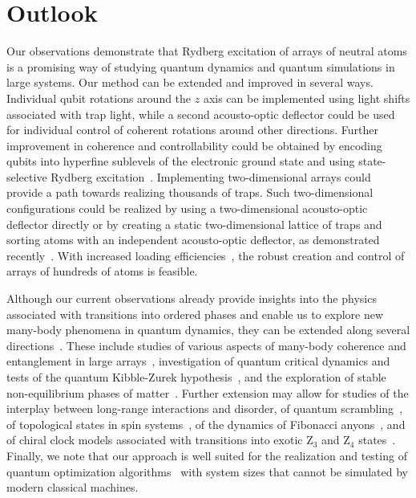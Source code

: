\documentclass[prl,nobalancelastpage,twocolumn,superscriptaddress,nofootinbib]{revtex4}
\begin{document}
\section{Outlook}
Our observations demonstrate that Rydberg excitation of arrays of neutral atoms
is a promising way of studying quantum dynamics and quantum simulations in
large systems. Our method can be extended and improved in several ways.
Individual qubit rotations around the $z$ axis can be implemented using light
shifts associated with trap light, while a second acousto-optic deflector could be used for
individual control of coherent rotations around other directions. Further
improvement in coherence and controllability could be obtained by encoding qubits
into hyperfine sublevels of the electronic ground state and using
state-selective Rydberg excitation~\cite{Zeiher2017}.  Implementing
two-dimensional arrays could provide a path towards realizing thousands of
traps. Such two-dimensional configurations could be realized by using
a two-dimensional acousto-optic deflector directly or by creating a static two-dimensional
lattice of traps and sorting atoms with an independent acousto-optic deflector, as demonstrated
recently~\cite{Barredo2016}. With increased
loading efficiencies~\cite{Lester2015}, the robust creation and control of
arrays of hundreds of atoms is feasible. 

Although our current observations already provide insights into
the physics associated with transitions into ordered phases and enable us to explore
new many-body phenomena in quantum dynamics, they can be extended
along several directions~\cite{Weimer2010_b}. These include studies of various
aspects of many-body coherence and entanglement in large
arrays~\cite{Pichler2016}, investigation of quantum critical dynamics and tests
of the quantum Kibble-Zurek hypothesis~\cite{Zurek2005}, and the exploration of
stable non-equilibrium phases of matter~\cite{Schiulaz2015}. Further extension
may allow for studies of the interplay between long-range interactions and
disorder, of quantum scrambling~\cite{Swingle2016}, of topological states in spin
systems~\cite{Chandran2016}, of the dynamics of Fibonacci
anyons~\cite{Feiguin2007,Lesanovsky2012}, and of chiral clock
models associated with transitions into exotic Z$_3$ and Z$_4$
states~\cite{Huse1984}. Finally, we note that our approach is well suited for
the realization and testing of quantum optimization
algorithms~\cite{Lechner2015,Farhi2016} with system sizes that cannot be
simulated by modern classical machines.
\end{document}
